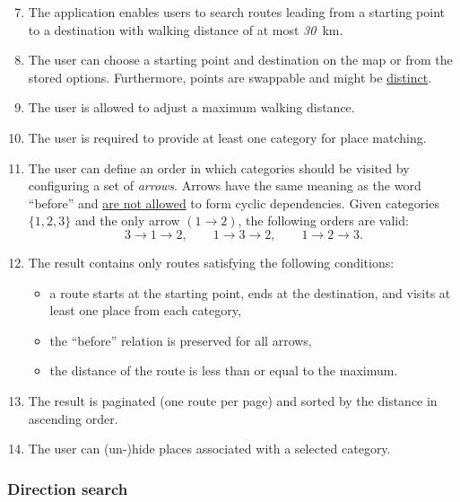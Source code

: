 \begin{enumerate}[label=\textbf{F\arabic*}]\setcounter{enumi}{6}
\item\label{itm:f-search-routes-automatic} The application enables users to search routes leading from a starting point to a destination with walking distance of at most \emph{30}~km.
\item\label{itm:f-search-routes-source-target} The user can choose a starting point and destination on the map or from the stored options. Furthermore, points are swappable and might be \underline{distinct}.
\item\label{itm:f-search-routes-dist} The user is allowed to adjust a maximum walking distance.
\item\label{itm:f-search-routes-cats} The user is required to provide at least one category for place matching.
\item\label{itm:f-search-routes-arrows} The user can define an order in which categories should be visited by configuring a set of \emph{arrows}. Arrows have the same meaning as the word ``before'' and \underline{are not allowed} to form cyclic dependencies. Given categories $\{ 1, 2, 3 \}$ and the only arrow $(1 \to 2)$, the following orders are valid:
\begin{equation*}3 \to 1 \to 2, \qquad 1 \to 3 \to 2, \qquad 1 \to 2 \to 3.\end{equation*}
\item\label{itm:f-search-routes-valid} The result contains only routes satisfying the following conditions:
\begin{itemize}
\item a route starts at the starting point, ends at the destination, and visits at least one place from each category,
\item the ``before'' relation is preserved for all arrows,
\item the distance of the route is less than or equal to the maximum.
\end{itemize}
\item\label{itm:f-search-routes-list} The result is paginated (one route per page) and sorted by the distance in ascending order.
\item\label{itm:f-search-routes-filter} The user can (un-)hide places associated with a selected category.
\end{enumerate}

\subsubsection*{Direction search}

